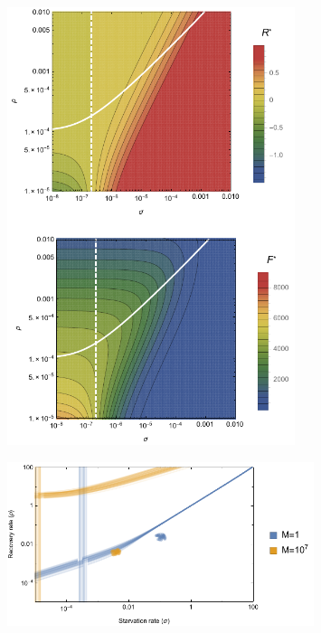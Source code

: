 \documentclass[12pt,english]{article}
\begin{document}
\begin{spacing}{1.9}
 \begin{figure}[h]
 	\centering
 	\includegraphics[width=0.75\textwidth]{fig_FixedPoint.pdf}
 	\caption{
 	}
 	\label{Hopfb}
 \end{figure}


 \begin{figure}[h]
 	\centering
 	\includegraphics[width=0.8\textwidth]{fig_DataHopf.pdf}
 	\caption{
 	}
 	\label{DataHopf}
 \end{figure}
 

\end{spacing}
\end{document}
